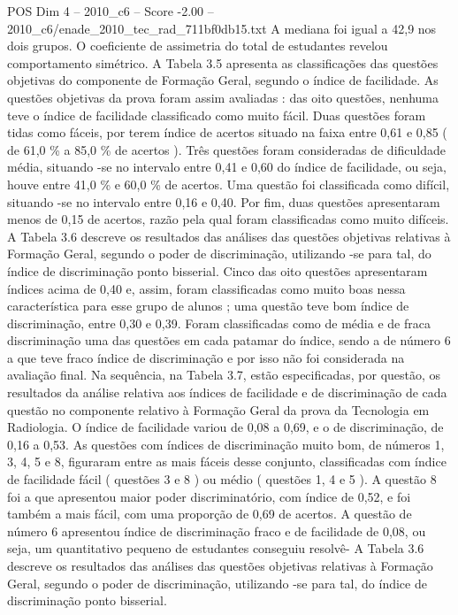\begin{textsample}{POS Dim 4 – 2010\_c6 – Score -2.00 – 2010\_c6/enade\_2010\_tec\_rad\_711bf0db15.txt}
A mediana foi igual a 42,9 nos dois grupos.
O coeficiente de assimetria do total de estudantes revelou comportamento simétrico.
A Tabela 3.5 apresenta as classificações das questões objetivas do componente de Formação Geral, segundo o índice de facilidade.
As questões objetivas da prova foram assim avaliadas : das oito questões, nenhuma teve o índice de facilidade classificado como muito fácil.
Duas questões foram tidas como fáceis, por terem índice de acertos situado na faixa entre 0,61 e 0,85 ( de 61,0 \% a 85,0 \% de acertos ).
Três questões foram consideradas de dificuldade média, situando -se no intervalo entre 0,41 e 0,60 do índice de facilidade, ou seja, houve entre 41,0 \% e 60,0 \% de acertos.
Uma questão foi classificada como difícil, situando -se no intervalo entre 0,16 e 0,40.
Por fim, duas questões apresentaram menos de 0,15 de acertos, razão pela qual foram classificadas como muito difíceis.
A Tabela 3.6 descreve os resultados das análises das questões objetivas relativas à Formação Geral, segundo o poder de discriminação, utilizando -se para tal, do índice de discriminação ponto bisserial.
Cinco das oito questões apresentaram índices acima de 0,40 e, assim, foram classificadas como muito boas nessa característica para esse grupo de alunos ; uma questão teve bom índice de discriminação, entre 0,30 e 0,39.
Foram classificadas como de média e de fraca discriminação uma das questões em cada patamar do índice, sendo a de número 6 a que teve fraco índice de discriminação e por isso não foi considerada na avaliação final.
Na sequência, na Tabela 3.7, estão especificadas, por questão, os resultados da análise relativa aos índices de facilidade e de discriminação de cada questão no componente relativo à Formação Geral da prova da Tecnologia em Radiologia.
O índice de facilidade variou de 0,08 a 0,69, e o de discriminação, de 0,16 a 0,53.
As questões com índices de discriminação muito bom, de números 1, 3, 4, 5 e 8, figuraram entre as mais fáceis desse conjunto, classificadas com índice de facilidade fácil ( questões 3 e 8 ) ou médio ( questões 1, 4 e 5 ).
A questão 8 foi a que apresentou maior poder discriminatório, com índice de 0,52, e foi também a mais fácil, com uma proporção de 0,69 de acertos.
A questão de número 6 apresentou índice de discriminação fraco e de facilidade de 0,08, ou seja, um quantitativo pequeno de estudantes conseguiu resolvê- A Tabela 3.6 descreve os resultados das análises das questões objetivas relativas à Formação Geral, segundo o poder de discriminação, utilizando -se para tal, do índice de discriminação ponto bisserial.

\end{textsample}
